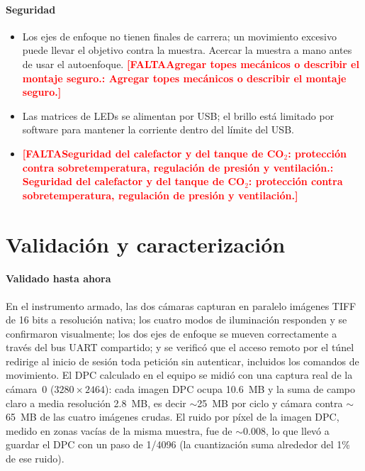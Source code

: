 \documentclass[preprint,12pt]{elsarticle}
\DeclareRobustCommand{\TODO}[1]{\textcolor{red}{\textbf{[FALTA\ifx\relax#1\relax\else: #1\fi]}}}
\begin{document}
\paragraph{Seguridad}
\begin{itemize}
\item Los ejes de enfoque no tienen finales de carrera; un movimiento
  excesivo puede llevar el objetivo contra la muestra. Acercar la muestra a
  mano antes de usar el autoenfoque. \TODO{Agregar topes mecánicos o
  describir el montaje seguro.}
\item Las matrices de LEDs se alimentan por USB; el brillo está limitado
  por software para mantener la corriente dentro del límite del USB.
\item \TODO{Seguridad del calefactor y del tanque de CO$_2$: protección
  contra sobretemperatura, regulación de presión y ventilación.}
\end{itemize}

\section{Validación y caracterización}

\paragraph{Validado hasta ahora} En el instrumento armado, las dos cámaras
capturan en paralelo imágenes TIFF de 16 bits a resolución nativa; los
cuatro modos de iluminación responden y se confirmaron visualmente; los
dos ejes de enfoque se mueven correctamente a través del bus UART
compartido; y se verificó que el acceso remoto por el túnel redirige al
inicio de sesión toda petición sin autenticar, incluidos los comandos de
movimiento. El DPC calculado en el equipo se midió con una captura real
de la cámara~0 ($3280\times2464$): cada imagen DPC ocupa 10.6~MB y la suma
de campo claro a media resolución 2.8~MB, es decir $\sim$25~MB por ciclo y
cámara contra $\sim$65~MB de las cuatro imágenes crudas. El ruido por
píxel de la imagen DPC, medido en zonas vacías de la misma muestra, fue de
$\sim$0.008, lo que llevó a guardar el DPC con un paso de 1/4096 (la
cuantización suma alrededor del 1\% de ese ruido).
\end{document}

